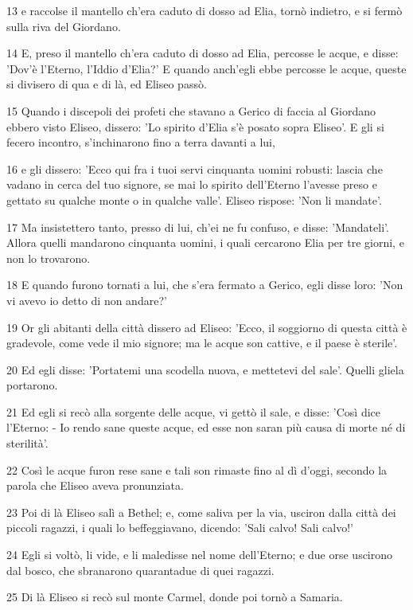 \par 13 e raccolse il mantello ch'era caduto di dosso ad Elia, tornò indietro, e si fermò sulla riva del Giordano.
\par 14 E, preso il mantello ch'era caduto di dosso ad Elia, percosse le acque, e disse: 'Dov'è l'Eterno, l'Iddio d'Elia?' E quando anch'egli ebbe percosse le acque, queste si divisero di qua e di là, ed Eliseo passò.
\par 15 Quando i discepoli dei profeti che stavano a Gerico di faccia al Giordano ebbero visto Eliseo, dissero: 'Lo spirito d'Elia s'è posato sopra Eliseo'. E gli si fecero incontro, s'inchinarono fino a terra davanti a lui,
\par 16 e gli dissero: 'Ecco qui fra i tuoi servi cinquanta uomini robusti: lascia che vadano in cerca del tuo signore, se mai lo spirito dell'Eterno l'avesse preso e gettato su qualche monte o in qualche valle'. Eliseo rispose: 'Non li mandate'.
\par 17 Ma insistettero tanto, presso di lui, ch'ei ne fu confuso, e disse: 'Mandateli'. Allora quelli mandarono cinquanta uomini, i quali cercarono Elia per tre giorni, e non lo trovarono.
\par 18 E quando furono tornati a lui, che s'era fermato a Gerico, egli disse loro: 'Non vi avevo io detto di non andare?'
\par 19 Or gli abitanti della città dissero ad Eliseo: 'Ecco, il soggiorno di questa città è gradevole, come vede il mio signore; ma le acque son cattive, e il paese è sterile'.
\par 20 Ed egli disse: 'Portatemi una scodella nuova, e mettetevi del sale'. Quelli gliela portarono.
\par 21 Ed egli si recò alla sorgente delle acque, vi gettò il sale, e disse: 'Così dice l'Eterno: - Io rendo sane queste acque, ed esse non saran più causa di morte né di sterilità'.
\par 22 Così le acque furon rese sane e tali son rimaste fino al dì d'oggi, secondo la parola che Eliseo aveva pronunziata.
\par 23 Poi di là Eliseo salì a Bethel; e, come saliva per la via, usciron dalla città dei piccoli ragazzi, i quali lo beffeggiavano, dicendo: 'Sali calvo! Sali calvo!'
\par 24 Egli si voltò, li vide, e li maledisse nel nome dell'Eterno; e due orse uscirono dal bosco, che sbranarono quarantadue di quei ragazzi.
\par 25 Di là Eliseo si recò sul monte Carmel, donde poi tornò a Samaria.

